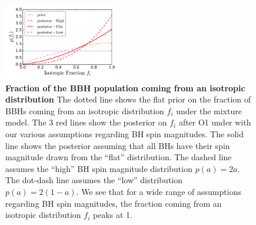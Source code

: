 \documentclass[modern,linenumbers]{aastex61}
\begin{document}
%
\begin{figure}
\centering
\includegraphics[width=0.45\textwidth]{../plots/posterior_on_isotropic_fraction.png}
\caption{\textbf{Fraction of the BBH population coming from an
isotropic distribution} The dotted line shows the flat
prior on the fraction of BBHs coming from an isotropic
distribution $f_i$ under the mixture model. The 3 red lines show
the posterior on $f_i$ after O1 under with our various
assumptions regarding BH spin magnitudes.
The solid line shows the posterior assuming that all BHs have
their spin magnitude drawn
from the ``flat'' distribution. The dashed line assumes the
``high'' BH spin magnitude distribution $p(a) = 2a$. The
dot-dash line assumes the ``low'' distribution $p(a) = 2(1-a)$.
We see that for a wide range of assumptions regarding BH spin
magnitudes, the fraction coming from an isotropic distribution
$f_i$ peaks at 1.}
\label{fig:mixture_fraction_posterior}
\end{figure}
%

%
\end{document}

